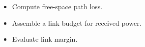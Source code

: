 \begin{objectives}
\begin{itemize}[leftmargin=1.4em,itemsep=2pt]
\item Compute free-space path loss.
\item Assemble a link budget for received power.
\item Evaluate link margin.
\end{itemize}
\end{objectives}

